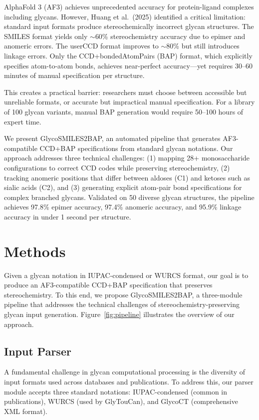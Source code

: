 \documentclass[11pt,a4paper]{article}
\begin{document}
AlphaFold 3 (AF3) achieves unprecedented accuracy for protein-ligand complexes including glycans. However, Huang et al.\ (2025) identified a critical limitation: standard input formats produce stereochemically incorrect glycan structures. The SMILES format yields only $\sim$60\% stereochemistry accuracy due to epimer and anomeric errors. The userCCD format improves to $\sim$80\% but still introduces linkage errors. Only the CCD+bondedAtomPairs (BAP) format, which explicitly specifies atom-to-atom bonds, achieves near-perfect accuracy---yet requires 30--60 minutes of manual specification per structure.

This creates a practical barrier: researchers must choose between accessible but unreliable formats, or accurate but impractical manual specification. For a library of 100 glycan variants, manual BAP generation would require 50--100 hours of expert time.

We present GlycoSMILES2BAP, an automated pipeline that generates AF3-compatible CCD+BAP specifications from standard glycan notations. Our approach addresses three technical challenges: (1) mapping 28+ monosaccharide configurations to correct CCD codes while preserving stereochemistry, (2) tracking anomeric positions that differ between aldoses (C1) and ketoses such as sialic acids (C2), and (3) generating explicit atom-pair bond specifications for complex branched glycans. Validated on 50 diverse glycan structures, the pipeline achieves 97.8\% epimer accuracy, 97.4\% anomeric accuracy, and 95.9\% linkage accuracy in under 1 second per structure.

\section{Methods}

Given a glycan notation in IUPAC-condensed or WURCS format, our goal is to produce an AF3-compatible CCD+BAP specification that preserves stereochemistry. To this end, we propose GlycoSMILES2BAP, a three-module pipeline that addresses the technical challenges of stereochemistry-preserving glycan input generation. Figure~\ref{fig:pipeline} illustrates the overview of our approach.

\subsection{Input Parser}
\label{sec:parser}

A fundamental challenge in glycan computational processing is the diversity of input formats used across databases and publications. To address this, our parser module accepts three standard notations: IUPAC-condensed (common in publications), WURCS (used by GlyTouCan), and GlycoCT (comprehensive XML format).
\end{document}
